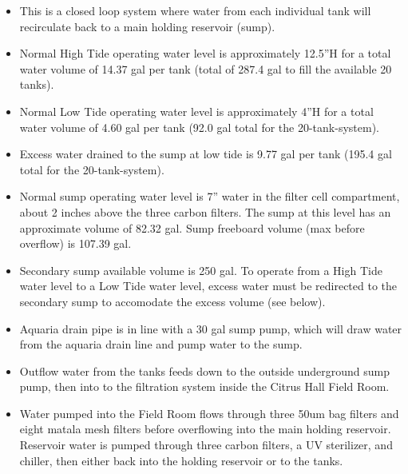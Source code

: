 \documentclass[
]{book}
\providecommand{\tightlist}{%
  \setlength{\itemsep}{0pt}\setlength{\parskip}{0pt}}
\begin{document}
\begin{itemize}
\tightlist
\item
  This is a closed loop system where water from each individual tank will recirculate back to a main holding reservoir (sump).\\
\item
  Normal High Tide operating water level is approximately 12.5''H for a total water volume of 14.37 gal per tank (total of 287.4 gal to fill the available 20 tanks).\\
\item
  Normal Low Tide operating water level is approximately 4''H for a total water volume of 4.60 gal per tank (92.0 gal total for the 20-tank-system).\\
\item
  Excess water drained to the sump at low tide is 9.77 gal per tank (195.4 gal total for the 20-tank-system).\\
\item
  Normal sump operating water level is 7'' water in the filter cell compartment, about 2 inches above the three carbon filters. The sump at this level has an approximate volume of 82.32 gal. Sump freeboard volume (max before overflow) is 107.39 gal.\\
\item
  Secondary sump available volume is 250 gal. To operate from a High Tide water level to a Low Tide water level, excess water must be redirected to the secondary sump to accomodate the excess volume (see below).\\
\item
  Aquaria drain pipe is in line with a 30 gal sump pump, which will draw water from the aquaria drain line and pump water to the sump.\\
\item
  Outflow water from the tanks feeds down to the outside underground sump pump, then into to the filtration system inside the Citrus Hall Field Room.\\
\item
  Water pumped into the Field Room flows through three 50um bag filters and eight matala mesh filters before overflowing into the main holding reservoir. Reservoir water is pumped through three carbon filters, a UV sterilizer, and chiller, then either back into the holding reservoir or to the tanks.


\end{itemize}
\end{document}
